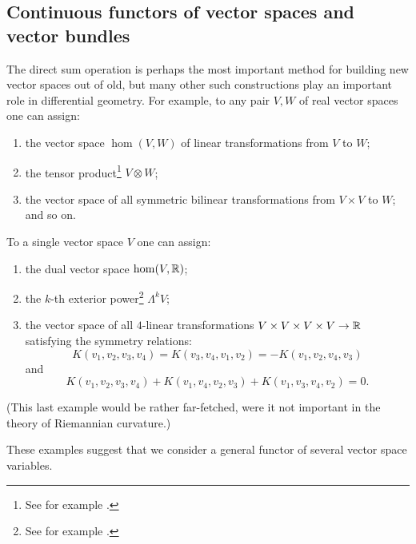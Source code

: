 \subsection*{Continuous functors of vector spaces and vector bundles}
The
direct sum operation is perhaps the most important method for building
new vector spaces out of old, but many other such constructions play an
important role in differential geometry. For example, to any pair $V, W$ of
real vector spaces one can assign:

\begin{enumerate}[label=\arabic*),leftmargin=2\parindent ]
	\item the vector space $\hom(V, W)$ of linear transformations from $V$ to
	$W$;
	\item the tensor product\footnote{See for example \cite[pp. 408, 424]{3}.} $V\otimes W$;
	\item the vector space of all symmetric bilinear transformations from
	$V \times V$ to $W$; and so on.
\end{enumerate}
To a single vector space $V$ one can assign:

\begin{enumerate}[resume,label=\arabic*),leftmargin=2\parindent ]
	\item the dual vector space $\hom(V, \boldsymbol{\mathbb{R}})$;%
	\item the $k$-th exterior power\footnote{See for example \cite[pp. 408, 424]{3}.} $\Lambda^k V$;
	\item the vector space of all $4$-linear transformations
	$V \times V\times V \times V\to \boldsymbol{\mathbb{R}}$ satisfying the symmetry relations:
	\[ K(v_1,v_2,v_3,v_4)=K(v_3,v_4,v_1,v_2)=-K(v_1,v_2,v_4,v_3)\]
	and
	\[ K(v_1,v_2,v_3,v_4)+K(v_1,v_4,v_2,v_3)+K(v_1,v_3,v_4,v_2)=0.\]
\end{enumerate}
(This last example would be rather far-fetched, were it not important in
the theory of Riemannian curvature.)

These examples suggest that we consider a general functor of several vector space variables.

